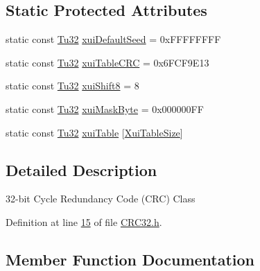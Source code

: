 \subsection*{Static Protected Attributes}
\begin{DoxyCompactItemize}
\item 
static const \mbox{\hyperlink{namespace_g_n_common_a941b527ef318f318aed7903dc832b7e4}{Tu32}} \mbox{\hyperlink{class_g_n_common_1_1_n_data_authentication_1_1_tc_c_r_c32_a07c2c3cd02a6f0eedc7a56565f7960c1}{xui\+Default\+Seed}} = 0x\+F\+F\+F\+F\+F\+F\+FF
\item 
static const \mbox{\hyperlink{namespace_g_n_common_a941b527ef318f318aed7903dc832b7e4}{Tu32}} \mbox{\hyperlink{class_g_n_common_1_1_n_data_authentication_1_1_tc_c_r_c32_aafa160e99ae03386b426884450ba3796}{xui\+Table\+C\+RC}} = 0x6\+F\+C\+F9\+E13
\item 
static const \mbox{\hyperlink{namespace_g_n_common_a941b527ef318f318aed7903dc832b7e4}{Tu32}} \mbox{\hyperlink{class_g_n_common_1_1_n_data_authentication_1_1_tc_c_r_c32_aae1c17e2c8f312d0bf2e062a5412ada8}{xui\+Shift8}} = 8
\item 
static const \mbox{\hyperlink{namespace_g_n_common_a941b527ef318f318aed7903dc832b7e4}{Tu32}} \mbox{\hyperlink{class_g_n_common_1_1_n_data_authentication_1_1_tc_c_r_c32_ab156bd5eaab2fe267499870a8f6e4925}{xui\+Mask\+Byte}} = 0x000000\+FF
\item 
static const \mbox{\hyperlink{namespace_g_n_common_a941b527ef318f318aed7903dc832b7e4}{Tu32}} \mbox{\hyperlink{class_g_n_common_1_1_n_data_authentication_1_1_tc_c_r_c32_a4aafd40037856d1bd4ea6f6ce0928836}{xui\+Table}} \mbox{[}\mbox{\hyperlink{class_g_n_common_1_1_n_data_authentication_1_1_tc_c_r_c32_a520aaabe0f4ade7f38afd480281b2180}{Xui\+Table\+Size}}\mbox{]}
\end{DoxyCompactItemize}


\subsection{Detailed Description}
32-\/bit Cycle Redundancy Code (C\+RC) Class 

Definition at line \mbox{\hyperlink{_c_r_c32_8h_source_l00015}{15}} of file \mbox{\hyperlink{_c_r_c32_8h_source}{C\+R\+C32.\+h}}.



\subsection{Member Function Documentation}
\mbox{\label{class_g_n_common_1_1_n_data_authentication_1_1_tc_c_r_c32_a2f822ac900cdba0a94b8e9361eb86b5c}} 
